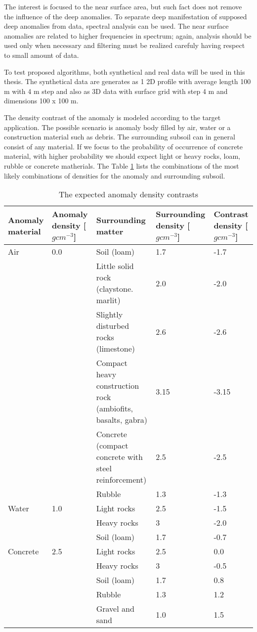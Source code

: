 \documentclass[FM]{tulthesis}
\begin{document}
The interest is focused to the near surface area, but such fact does not remove the influence of the deep anomalies. To separate deep manifestation of supposed deep anomalies from data, spectral analysis can be used. The near surface anomalies are related to higher frequencies in spectrum; again, analysis should be used only when necessary and filtering must be realized carefuly having respect to small amount of data. 

To test proposed algorithms, both synthetical and real data will be used in this thesis. The synthetical data are generates as 1 2D profile with average length 100 m with 4 m step and also as 3D data with surface grid with step 4 m and dimensions 100 x 100 m. 

The density contrast of the anomaly is modeled according to the target application. The possible scenario is anomaly body filled by air, water or a construction material such as debris. The surrounding subsoil can in general consist of any material. If we focus to the probability of occurrence of concrete material, with higher probability we should expect light or heavy rocks, loam, rubble or concrete matherials. The Table \ref{tab:DensityModel} lists the combinations of the most likely combinations of densities for the anomaly and surrounding subsoil.

\renewcommand{\arraystretch}{1.2}
\begin{table}[htbp]
\vspace{4mm}
\begin{tabular}{|p{2cm}|p{2cm}|p{3.5cm}|p{2.5cm}|p{2cm}|}
\hline\textbf{Anomaly material} & \textbf{Anomaly density [$gcm^{-3}$]} & \textbf{Surrounding matter} & \textbf{Surrounding density [$gcm^{-3}$]} & \textbf{Contrast density [$gcm^{-3}$]}\\
\hline
\hline
Air&0.0&Soil (loam)&1.7&-1.7\\
\hline
&&Little solid rock (claystone. marlit)&2.0&-2.0\\
\hline
&&Slightly disturbed rocks (limestone)&2.6&-2.6\\
\hline
&&Compact heavy construction rock (ambiofits, basalts, gabra)&3.15&-3.15\\
\hline
&&Concrete (compact concrete with steel reinforcement)&2.5&-2.5\\
\hline
&&Rubble&1.3&-1.3\\
\hline
Water&1.0&Light rocks&2.5&-1.5\\
\hline
&&Heavy rocks&3&-2.0\\
\hline
&&Soil (loam)&1.7&-0.7\\
\hline
Concrete&2.5&Light rocks&2.5&0.0\\
\hline
&&Heavy rocks&3&-0.5\\
\hline
&&Soil (loam)&1.7&0.8\\
\hline
&&Rubble&1.3&1.2\\
\hline
&&Gravel and sand&1.0&1.5\\
\hline
\end{tabular} 
\renewcommand{\tablename}{Table}
\caption[The expected anomaly density contrasts]{The expected anomaly density contrasts}
\label{tab:DensityModel}
\vspace{4mm}
\end{table}
\end{document}
